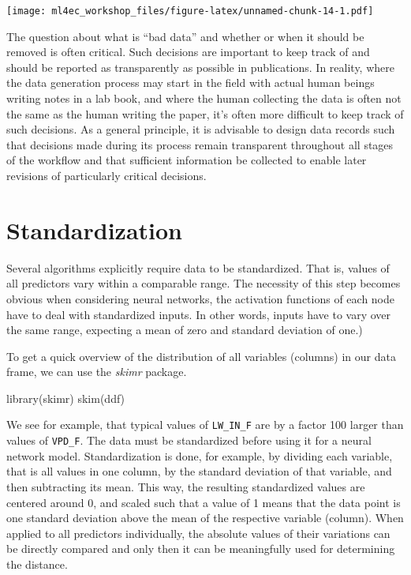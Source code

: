 \documentclass[
]{book}
\newenvironment{Shaded}{\begin{snugshade}}{\end{snugshade}}
\newcommand{\FunctionTok}[1]{\textcolor[rgb]{0.00,0.00,0.00}{#1}}
\newcommand{\NormalTok}[1]{#1}
\begin{document}
\texttt{[image: ml4ec\_workshop\_files/figure-latex/unnamed-chunk-14-1.pdf]}

The question about what is ``bad data'' and whether or when it should be removed is often critical. Such decisions are important to keep track of and should be reported as transparently as possible in publications. In reality, where the data generation process may start in the field with actual human beings writing notes in a lab book, and where the human collecting the data is often not the same as the human writing the paper, it's often more difficult to keep track of such decisions. As a general principle, it is advisable to design data records such that decisions made during its process remain transparent throughout all stages of the workflow and that sufficient information be collected to enable later revisions of particularly critical decisions.

\hypertarget{standardization}{%
\section{Standardization}\label{standardization}}

Several algorithms explicitly require data to be standardized. That is, values of all predictors vary within a comparable range. The necessity of this step becomes obvious when considering neural networks, the activation functions of each node have to deal with standardized inputs. In other words, inputs have to vary over the same range, expecting a mean of zero and standard deviation of one.)

To get a quick overview of the distribution of all variables (columns) in our data frame, we can use the \emph{skimr} package.

\begin{Shaded}
\begin{Highlighting}[]
\FunctionTok{library}\NormalTok{(skimr)}
\FunctionTok{skim}\NormalTok{(ddf)}
\end{Highlighting}
\end{Shaded}

We see for example, that typical values of \texttt{LW\_IN\_F} are by a factor 100 larger than values of \texttt{VPD\_F}. The data must be standardized before using it for a neural network model. Standardization is done, for example, by dividing each variable, that is all values in one column, by the standard deviation of that variable, and then subtracting its mean. This way, the resulting standardized values are centered around 0, and scaled such that a value of 1 means that the data point is one standard deviation above the mean of the respective variable (column). When applied to all predictors individually, the absolute values of their variations can be directly compared and only then it can be meaningfully used for determining the distance.
\end{document}
